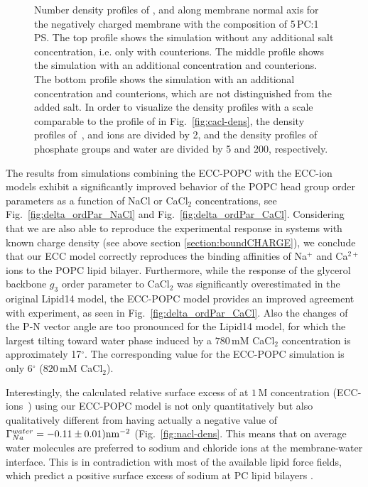 \begin{figure}[tbp!]
  \caption{\label{fig:nacl-dens_PCPS} 
    Number density profiles of ,  and  along membrane normal axis 
    for the negatively charged membrane with the composition of 5\,PC:1\,PS. 
    The top profile shows the simulation without any additional salt concentration, i.e. only with  counterions. 
    The middle profile shows the simulation with an additional  concentration and  counterions. 
    The bottom profile shows the simulation with an additional  concentration and  counterions, which are not distinguished from the added salt. 
    In order to visualize the density profiles with a scale comparable to the profile of  in Fig.~\ref{fig:cacl-dens},  
    the density profiles of~,  and  ions are divided by 2, and 
    the density profiles of phosphate groups and water are divided by 5 and 200, respectively.  
    } 
\end{figure} 



The results from simulations combining the ECC-POPC with the ECC-ion models \citep{martinek17, kohagen16, Pluharova2014} exhibit a significantly improved behavior of the POPC head group order parameters as a function of NaCl or CaCl$_2$ concentrations, see Fig.~\ref{fig:delta_ordPar_NaCl} and Fig.~\ref{fig:delta_ordPar_CaCl}. Considering that we are also able to reproduce the experimental response in systems with known charge density (see above section \ref{section:boundCHARGE}), we conclude that our ECC model correctly reproduces the binding affinities of Na$^{+}$ and Ca$^{2+}$ ions to the POPC lipid bilayer. Furthermore, while the response of the glycerol backbone $g_3$ order parameter to CaCl$_2$ was significantly overestimated in the original Lipid14 model, the ECC-POPC model provides an improved agreement with experiment, as seen in Fig.~\ref{fig:delta_ordPar_CaCl}. 
Also the changes of the P-N vector angle are too pronounced for the Lipid14 model, 
for which the largest tilting toward water phase induced by a $780\,\mathrm{mM}$ 
CaCl$_2$ concentration is approximately 17$^{\circ}$. The corresponding value 
for the ECC-POPC simulation is only 6$^{\circ}$ ($820\,\mathrm{mM}$ CaCl$_2$).  

Interestingly, the calculated relative surface excess of  at $1\,\mathrm{M}$ concentration (ECC-ions~\citep{Pluharova2014}) using our ECC-POPC model is not only quantitatively but also qualitatively different from  having actually a negative value of $\Gamma_{Na}^{water} = -0.11 \pm 0.01) \rm{nm}^{-2}$ (Fig.~\ref{fig:nacl-dens}. This  
means that on average water molecules are preferred to sodium and chloride ions at the membrane-water interface.   
This is in contradiction with most of the available lipid force fields, which predict a positive surface excess of sodium at PC lipid bilayers \citep{catte16}. 
 
